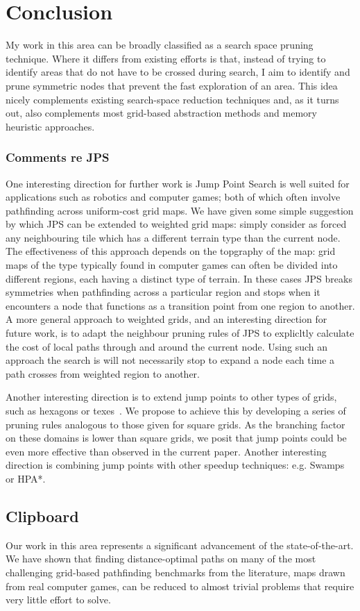\chapter{Conclusion}
\label{cha::conclusion}
My work in this area can be broadly classified as a search space pruning
technique. Where it differs from existing efforts is that, instead of trying to
identify areas that do not have to be crossed during search, I aim to identify
and prune symmetric nodes that prevent the fast exploration of an area. This
idea nicely complements existing search-space reduction techniques and, as it
turns out, also complements most grid-based abstraction methods and memory
heuristic approaches.

\subsection{Comments re JPS}
One interesting direction for further work is Jump Point Search is well suited
for applications such as robotics and computer games; both of which often
involve pathfinding across uniform-cost grid maps.  We have given some simple
suggestion by which JPS can be extended to weighted grid maps: simply consider
as forced any neighbouring tile which has a different terrain type than the
current node. The effectiveness of this approach depends on the topgraphy of
the map: grid maps of the type typically found in computer games can often be
divided into different regions, each having a distinct type of terrain. In
these cases JPS breaks symmetries when pathfinding across a particular region
and stops when it encounters a node that functions as a transition point from
one region to another. A more general approach to weighted grids, and an
interesting direction for future work, is to adapt the neighbour pruning rules
of JPS to explicltly calculate the cost of local paths through and around the
current node.  Using such an approach the search is will not necessarily stop
to expand a node each time a path crosses from weighted region to another.

Another interesting direction is to extend jump points to other types of
grids, such as hexagons or texes~\citep{yap02}. We propose to achieve this by
developing  a series of pruning rules analogous to those given for square
grids.  As the branching factor on these domains is lower than square grids,
we posit that jump points could be even more effective than observed in the
current paper.  Another interesting direction is combining jump points with
other speedup techniques: e.g. Swamps or HPA*.

\section{Clipboard}
Our work in this area represents a significant advancement of the state-of-the-art.
We have shown that finding distance-optimal paths on many of the most challenging 
grid-based pathfinding benchmarks from the literature, maps drawn from real computer games,
can be reduced to almost trivial problems that require very little effort to solve.
